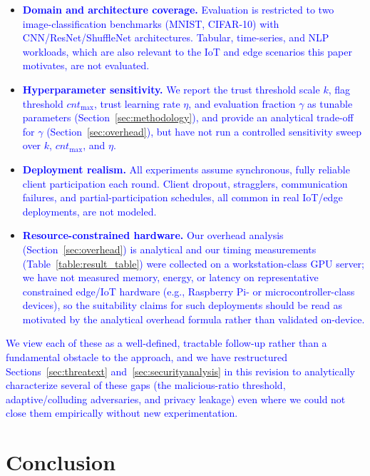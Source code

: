 \documentclass[conference]{IEEEtran}
\begin{document}
\begin{itemize}
    \item \textcolor{blue}{\textbf{Domain and architecture coverage.} Evaluation is restricted to two image-classification benchmarks (MNIST, CIFAR-10) with CNN/ResNet/ShuffleNet architectures. Tabular, time-series, and NLP workloads, which are also relevant to the IoT and edge scenarios this paper motivates, are not evaluated.}
    \item \textcolor{blue}{\textbf{Hyperparameter sensitivity.} We report the trust threshold scale $k$, flag threshold $cnt_{\max}$, trust learning rate $\eta$, and evaluation fraction $\gamma$ as tunable parameters (Section~\ref{sec:methodology}), and provide an analytical trade-off for $\gamma$ (Section~\ref{sec:overhead}), but have not run a controlled sensitivity sweep over $k$, $cnt_{\max}$, and $\eta$.}
    \item \textcolor{blue}{\textbf{Deployment realism.} All experiments assume synchronous, fully reliable client participation each round. Client dropout, stragglers, communication failures, and partial-participation schedules, all common in real IoT/edge deployments, are not modeled.}
    \item \textcolor{blue}{\textbf{Resource-constrained hardware.} Our overhead analysis (Section~\ref{sec:overhead}) is analytical and our timing measurements (Table~\ref{table:result_table}) were collected on a workstation-class GPU server; we have not measured memory, energy, or latency on representative constrained edge/IoT hardware (e.g., Raspberry Pi- or microcontroller-class devices), so the suitability claims for such deployments should be read as motivated by the analytical overhead formula rather than validated on-device.}
\end{itemize}

\textcolor{blue}{We view each of these as a well-defined, tractable follow-up rather than a fundamental obstacle to the approach, and we have restructured Sections~\ref{sec:threatext} and~\ref{sec:securityanalysis} in this revision to analytically characterize several of these gaps (the malicious-ratio threshold, adaptive/colluding adversaries, and privacy leakage) even where we could not close them empirically without new experimentation.}

\section{Conclusion}
\label{sec:conclusion}
\end{document}
